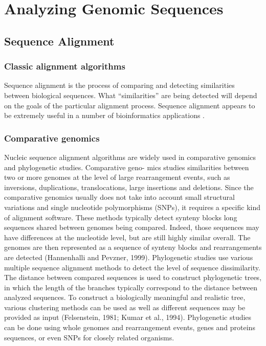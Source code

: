 \chapter{Analyzing Genomic Sequences}\label{ch:ch6}

\section{Sequence Alignment} 
\subsection{Classic alignment algorithms}
Sequence alignment is the process of comparing and detecting similarities between biological sequences. What “similarities” are being detected will depend on the goals of the particular alignment process. Sequence alignment appears to be extremely useful in a number of bioinformatics applications \cite{seq2018}.



\subsection{Comparative genomics}
Nucleic sequence alignment algorithms are widely used in comparative genomics and phylogenetic studies. Comparative geno-
mics studies similarities between two or more genomes at the level of large rearrangement events, such as inversions, duplications,
translocations, large insertions and deletions. Since the comparative genomics usually does not take into account small structural
variations and single nucleotide polymorphisms (SNPs), it requires a specific kind of alignment software. These methods typically
detect synteny blocks long sequences shared between genomes being compared. Indeed, those sequences may have differences at
the nucleotide level, but are still highly similar overall. The genomes are then represented as a sequence of synteny blocks and
rearrangements are detected (Hannenhalli and Pevzner, 1999).
Phylogenetic studies use various multiple sequence alignment methods to detect the level of sequence dissimilarity. The distance
between compared sequences is used to construct phylogenetic trees, in which the length of the branches typically correspond to the
distance between analyzed sequences. To construct a biologically meaningful and realistic tree, various clustering methods can be used
as well as different sequences may be provided as input (Felsenstein, 1981; Kumar et al., 1994). Phylogenetic studies can be done using
whole genomes and rearrangement events, genes and proteins sequences, or even SNPs for closely related organisms\cite{seq2018}.


